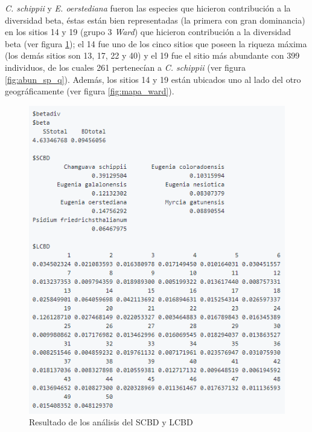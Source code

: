 \documentclass[11pt,]{article}
\begin{document}
\emph{C. schippii} y \emph{E. oerstediana} fueron las especies que
hicieron contribución a la diversidad beta, éstas están bien
representadas (la primera con gran dominancia) en los sitios 14 y 19
(grupo 3 \emph{Ward}) que hicieron contribución a la diversidad beta
(ver figura \ref{fig:beta_div}); el 14 fue uno de los cinco sitios que
poseen la riqueza máxima (los demás sitios son 13, 17, 22 y 40) y el 19
fue el sitio más abundante con 399 individuos, de los cuales 261
pertenecían a \emph{C. schippii} (ver figura \ref{fig:abun_sp_q}).
Además, los sitios 14 y 19 están ubicados uno al lado del otro
geográficamente (ver figura \ref{fig:mapa_ward}).

\begin{figure}
\centering
\includegraphics{beta_div.png}
\caption{Resultado de los análisis del SCBD y LCBD\label{fig:beta_div}}
\end{figure}
\end{document}
